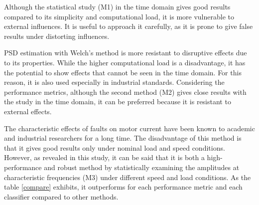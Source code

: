 Although the statistical study (M1) in the time domain gives good results compared to its simplicity and computational load, it is more vulnerable to external influences. It is useful to approach it carefully, as it is prone to give false results under distorting influences.

PSD estimation with Welch's method is more resistant to disruptive effects due to its properties. While the higher computational load is a disadvantage, it has the potential to show effects that cannot be seen in the time domain. For this reason, it is also used especially in industrial standards. Considering the performance metrics, although the second method (M2) gives close results with the study in the time domain, it can be preferred because it is resistant to external effects.

The characteristic effects of faults on motor current have been known to academic and industrial researchers for a long time. The disadvantage of this method is that it gives good results only under nominal load and speed conditions. However, as revealed in this study, it can be said that it is both a high-performance and robust method by statistically examining the amplitudes at characteristic frequencies (M3) under different speed and load conditions. As the table \ref{compare} exhibits, it outperforms for each performance metric and each classifier compared to other methods.

